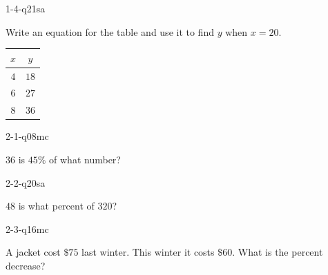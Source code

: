 
\begin{practiceQuestion}{1-4-q21}{sa}
\begin{questionText}
Write an equation for the table and use it to find $y$ when $x = 20$.

\begin{center}
\begin{tabular}{|c|c|}
\hline $x$ & $y$ \\ \hline $4$ & $18$ \\ $6$ & $27$ \\ $8$ & $36$ \\ \hline
\end{tabular}
\end{center}
\end{questionText}
\end{practiceQuestion}

\begin{practiceQuestion}{2-1-q08}{mc}
\begin{questionText}
$36$ is $45\%$ of what number?
\end{questionText}
\end{practiceQuestion}

\begin{practiceQuestion}{2-2-q20}{sa}
\begin{questionText}
$48$ is what percent of $320$?
\end{questionText}
\end{practiceQuestion}

\begin{practiceQuestion}{2-3-q16}{mc}
\begin{questionText}
A jacket cost $\$75$ last winter. This winter it costs $\$60$. What is the percent decrease?


\end{questionText}
\end{practiceQuestion}

